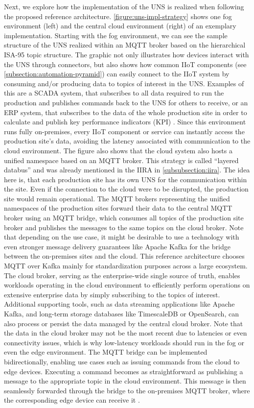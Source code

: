     \noindent Next, we explore how the implementation of the UNS is realized when following the proposed reference architecture. \autoref{figure:uns-impl-strategy} shows one fog environment (left) and the central cloud environment (right) of an exemplary implementation. Starting with the fog environment, we can see the sample structure of the UNS realized within an MQTT broker based on the hierarchical ISA-95 topic structure. The graphic not only illustrates how devices interact with the UNS through connectors, but also shows how common IIoT components (see \autoref{subsection:automation-pyramid}) can easily connect to the IIoT system by consuming and/or producing data to topics of interest in the UNS. Examples of this are a SCADA system, that subscribes to all data required to run the production and publishes commands back to the UNS for others to receive, or an ERP system, that subscribes to the data of the whole production site in order to calculate and publish key performance indicators (KPI) \cite{hivemq_essentials_uns}. Since this environment runs fully on-premises, every IIoT component or service can instantly access the production site's data, avoiding the latency associated with communication to the cloud environment. The figure also shows that the cloud system also hosts a unified namespace based on an MQTT broker. This strategy is called ``layered databus'' and was already mentioned in the IIRA in \autoref{subsubsection:iira}. The idea here is, that each production site has its own UNS for the communication within the site. Even if the connection to the cloud were to be disrupted, the production site would remain operational. The MQTT brokers representing the unified namespaces of the production sites forward their data to the central MQTT broker using an MQTT bridge, which consumes all topics of the production site broker and publishes the messages to the same topics on the cloud broker. Note that depending on the use case, it might be desirable to use a technology with even stronger message delivery guarantees like Apache Kafka for the bridge between the on-premises sites and the cloud. This reference architecture chooses MQTT over Kafka mainly for standardization purposes across a large ecosystem. The cloud broker, serving as the enterprise-wide single source of truth, enables workloads operating in the cloud environment to efficiently perform operations on extensive enterprise data by simply subscribing to the topics of interest. Additional supporting tools, such as data streaming applications like Apache Kafka, and long-term storage databases like TimescaleDB or OpenSearch, can also process or persist the data managed by the central cloud broker. Note that the data in the cloud broker may not be the most recent due to latencies or even connectivity issues, which is why low-latency workloads should run in the fog or even the edge environment. The MQTT bridge can be implemented bidirectionally, enabling use cases such as issuing commands from the cloud to edge devices. Executing a command becomes as straightforward as publishing a message to the appropriate topic in the cloud environment. This message is then seamlessly forwarded through the bridge to the on-premises MQTT broker, where the corresponding edge device can receive it \cite{building_iiot}.
    